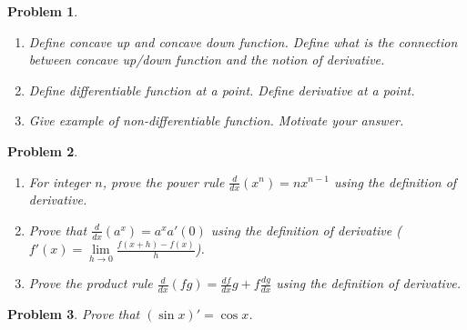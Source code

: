 \documentclass{article}
\newtheorem{problem}{Problem}
\begin{document}
\begin{problem} ~
\begin{enumerate}
\item Define concave up and concave down function. Define what is the connection between concave up/down function and the notion of derivative.
\item Define differentiable function at a point. Define derivative at a point.

\item Give example of non-differentiable function. Motivate your answer.
\end{enumerate}
\end{problem}
\begin{problem}~
\begin{enumerate}
\item For integer $n$, prove the power rule $\frac{d}{dx}(x^n)=n x^{n-1} $ using the definition of derivative.
\item Prove that $\frac{d}{dx} (a^x) = a^x a'(0)$ using the definition of derivative ($f'(x)=\lim\limits_{h\to 0}\frac{f(x+h)-f(x)}{h}$).
\item Prove the product rule $\frac{d}{dx} (f g)= \frac{df}{dx} g+ f \frac{dg}{dx} $ using the definition of derivative.
\end{enumerate}
\end{problem}
\begin{problem}
Prove that $(\sin x)'=\cos x$.
\end{problem}
\end{document}
